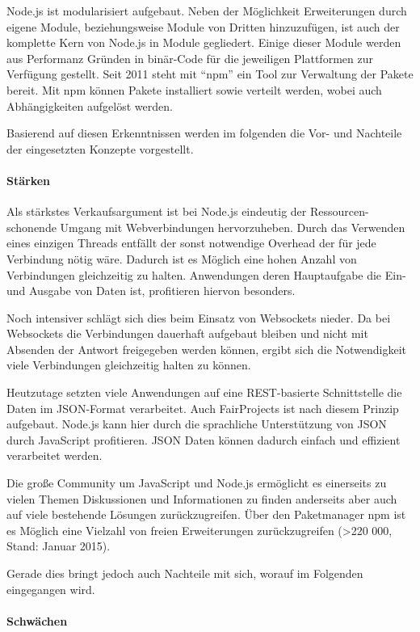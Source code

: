 \documentclass[]{article}
\begin{document}
Node.js ist modularisiert aufgebaut. Neben der Möglichkeit Erweiterungen
durch eigene Module, beziehungsweise Module von Dritten hinzuzufügen,
ist auch der komplette Kern von Node.js in Module gegliedert. Einige
dieser Module werden aus Performanz Gründen in binär-Code für die
jeweiligen Plattformen zur Verfügung gestellt. Seit 2011 steht mit
``npm'' ein Tool zur Verwaltung der Pakete bereit. Mit npm können Pakete
installiert sowie verteilt werden, wobei auch Abhängigkeiten aufgelöst
werden.

Basierend auf diesen Erkenntnissen werden im folgenden die Vor- und
Nachteile der eingesetzten Konzepte vorgestellt.

\paragraph{Stärken}\label{stuxe4rken}

Als stärkstes Verkaufsargument ist bei Node.js eindeutig der
Ressourcen-schonende Umgang mit Webverbindungen hervorzuheben. Durch das
Verwenden eines einzigen Threads entfällt der sonst notwendige Overhead
der für jede Verbindung nötig wäre. Dadurch ist es Möglich eine hohen
Anzahl von Verbindungen gleichzeitig zu halten. Anwendungen deren
Hauptaufgabe die Ein- und Ausgabe von Daten ist, profitieren hiervon
besonders.

Noch intensiver schlägt sich dies beim Einsatz von Websockets nieder. Da
bei Websockets die Verbindungen dauerhaft aufgebaut bleiben und nicht
mit Absenden der Antwort freigegeben werden können, ergibt sich die
Notwendigkeit viele Verbindungen gleichzeitig halten zu können.

Heutzutage setzten viele Anwendungen auf eine REST-basierte
Schnittstelle die Daten im JSON-Format verarbeitet. Auch FairProjects
ist nach diesem Prinzip aufgebaut. Node.js kann hier durch die
sprachliche Unterstützung von JSON durch JavaScript profitieren. JSON
Daten können dadurch einfach und effizient verarbeitet werden.

Die große Community um JavaScript und Node.js ermöglicht es einerseits
zu vielen Themen Diskussionen und Informationen zu finden anderseits
aber auch auf viele bestehende Lösungen zurückzugreifen. Über den
Paketmanager npm ist es Möglich eine Vielzahl von freien Erweiterungen
zurückzugreifen (\textgreater{}220 000, Stand: Januar 2015).

Gerade dies bringt jedoch auch Nachteile mit sich, worauf im Folgenden
eingegangen wird.

\paragraph{Schwächen}\label{schwuxe4chen}
\end{document}
